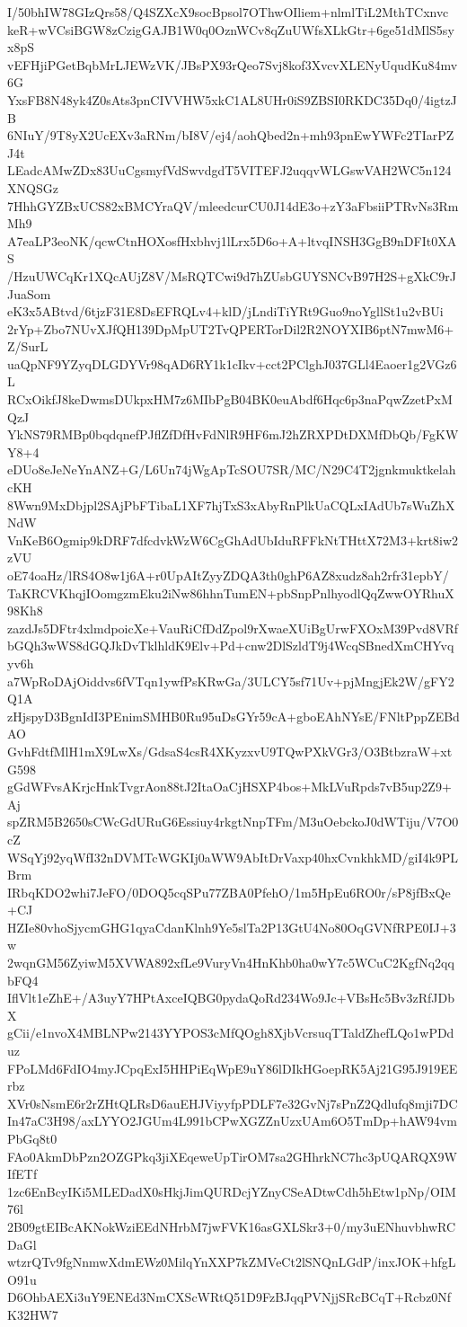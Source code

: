 I/50bhIW78GIzQrs58/Q4SZXcX9socBpsol7OThwOIliem+nlmlTiL2MthTCxnvc
keR+wVCsiBGW8zCzigGAJB1W0q0OznWCv8qZuUWfsXLkGtr+6ge51dMlS5syx8pS
vEFHjiPGetBqbMrLJEWzVK/JBsPX93rQeo7Svj8kof3XvcvXLENyUqudKu84mv6G
YxsFB8N48yk4Z0sAts3pnCIVVHW5xkC1AL8UHr0iS9ZBSI0RKDC35Dq0/4igtzJB
6NIuY/9T8yX2UcEXv3aRNm/bI8V/ej4/aohQbed2n+mh93pnEwYWFc2TIarPZJ4t
LEadcAMwZDx83UuCgsmyfVdSwvdgdT5VITEFJ2uqqvWLGswVAH2WC5n124XNQSGz
7HhhGYZBxUCS82xBMCYraQV/mleedcurCU0J14dE3o+zY3aFbsiiPTRvNs3RmMh9
A7eaLP3eoNK/qcwCtnHOXosfHxbhvj1lLrx5D6o+A+ltvqINSH3GgB9nDFIt0XAS
/HzuUWCqKr1XQcAUjZ8V/MsRQTCwi9d7hZUsbGUYSNCvB97H2S+gXkC9rJJuaSom
eK3x5ABtvd/6tjzF31E8DsEFRQLv4+klD/jLndiTiYRt9Guo9noYgllSt1u2vBUi
2rYp+Zbo7NUvXJfQH139DpMpUT2TvQPERTorDil2R2NOYXIB6ptN7mwM6+Z/SurL
uaQpNF9YZyqDLGDYVr98qAD6RY1k1cIkv+cct2PClghJ037GLl4Eaoer1g2VGz6L
RCxOikfJ8keDwmsDUkpxHM7z6MIbPgB04BK0euAbdf6Hqc6p3naPqwZzetPxMQzJ
YkNS79RMBp0bqdqnefPJflZfDfHvFdNlR9HF6mJ2hZRXPDtDXMfDbQb/FgKWY8+4
eDUo8eJeNeYnANZ+G/L6Un74jWgApTcSOU7SR/MC/N29C4T2jgnkmuktkelahcKH
8Wwn9MxDbjpl2SAjPbFTibaL1XF7hjTxS3xAbyRnPlkUaCQLxIAdUb7sWuZhXNdW
VnKeB6Ogmip9kDRF7dfcdvkWzW6CgGhAdUbIduRFFkNtTHttX72M3+krt8iw2zVU
oE74oaHz/lRS4O8w1j6A+r0UpAItZyyZDQA3th0ghP6AZ8xudz8ah2rfr31epbY/
TaKRCVKhqjIOomgzmEku2iNw86hhnTumEN+pbSnpPnlhyodlQqZwwOYRhuX98Kh8
zazdJs5DFtr4xlmdpoicXe+VauRiCfDdZpol9rXwaeXUiBgUrwFXOxM39Pvd8VRf
bGQh3wWS8dGQJkDvTklhldK9Elv+Pd+cnw2DlSzldT9j4WcqSBnedXmCHYvqyv6h
a7WpRoDAjOiddvs6fVTqn1ywfPsKRwGa/3ULCY5sf71Uv+pjMngjEk2W/gFY2Q1A
zHjspyD3BgnIdI3PEnimSMHB0Ru95uDsGYr59cA+gboEAhNYsE/FNltPppZEBdAO
GvhFdtfMlH1mX9LwXs/GdsaS4csR4XKyzxvU9TQwPXkVGr3/O3BtbzraW+xtG598
gGdWFvsAKrjcHnkTvgrAon88tJ2ItaOaCjHSXP4bos+MkLVuRpds7vB5up2Z9+Aj
spZRM5B2650sCWcGdURuG6Essiuy4rkgtNnpTFm/M3uOebckoJ0dWTiju/V7O0cZ
WSqYj92yqWfI32nDVMTcWGKIj0aWW9AbItDrVaxp40hxCvnkhkMD/giI4k9PLBrm
IRbqKDO2whi7JeFO/0DOQ5cqSPu77ZBA0PfehO/1m5HpEu6RO0r/sP8jfBxQe+CJ
HZIe80vhoSjycmGHG1qyaCdanKlnh9Ye5slTa2P13GtU4No80OqGVNfRPE0IJ+3w
2wqnGM56ZyiwM5XVWA892xfLe9VuryVn4HnKhb0ha0wY7c5WCuC2KgfNq2qqbFQ4
IflVlt1eZhE+/A3uyY7HPtAxceIQBG0pydaQoRd234Wo9Jc+VBsHc5Bv3zRfJDbX
gCii/e1nvoX4MBLNPw2143YYPOS3cMfQOgh8XjbVcrsuqTTaldZhefLQo1wPDduz
FPoLMd6FdIO4myJCpqExI5HHPiEqWpE9uY86lDIkHGoepRK5Aj21G95J919EErbz
XVr0sNsmE6r2rZHtQLRsD6auEHJViyyfpPDLF7e32GvNj7sPnZ2Qdlufq8mji7DC
In47aC3H98/axLYYO2JGUm4L991bCPwXGZZnUzxUAm6O5TmDp+hAW94vmPbGq8t0
FAo0AkmDbPzn2OZGPkq3jiXEqeweUpTirOM7sa2GHhrkNC7hc3pUQARQX9WIfETf
1zc6EnBcyIKi5MLEDadX0sHkjJimQURDcjYZnyCSeADtwCdh5hEtw1pNp/OIM76l
2B09gtEIBcAKNokWziEEdNHrbM7jwFVK16asGXLSkr3+0/my3uENhuvbhwRCDaGl
wtzrQTv9fgNnmwXdmEWz0MilqYnXXP7kZMVeCt2lSNQnLGdP/inxJOK+hfgLO91u
D6OhbAEXi3uY9ENEd3NmCXScWRtQ51D9FzBJqqPVNjjSRcBCqT+Rcbz0NfK32HW7
